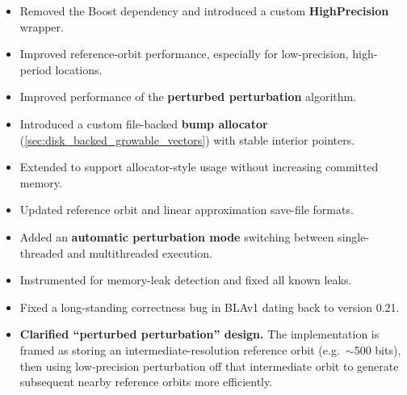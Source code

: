 \begin{itemize}

  \item Removed the Boost dependency and introduced a custom
  \textbf{HighPrecision} wrapper.

  \item Improved reference-orbit performance, especially for low-precision,
  high-period locations.

  \item Improved performance of the \textbf{perturbed perturbation} algorithm.

  \item Introduced a custom file-backed \textbf{bump allocator} (\cref{sec:disk_backed_growable_vectors}) with stable
  interior pointers.

  \item Extended  to support allocator-style usage
  without increasing committed memory.
  
  \item Updated reference orbit and linear approximation save-file formats.

  \item Added an \textbf{automatic perturbation mode} switching between single-threaded and multithreaded execution.

  \item Instrumented for memory-leak detection and fixed all known leaks.

  \item Fixed a long-standing correctness bug in BLAv1 dating back to version
  0.21.

  \item \textbf{Clarified ``perturbed perturbation'' design.} The implementation
  is framed as storing an intermediate-resolution reference orbit (e.g.\
  $\sim$500 bits), then using low-precision perturbation off that intermediate
  orbit to generate subsequent nearby reference orbits more efficiently.

\end{itemize}


